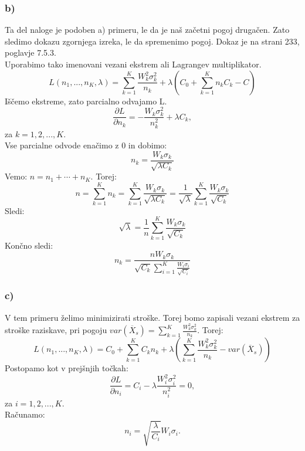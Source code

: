 \documentclass{article}
\begin{document}
\subsubsection*{b)}
Ta del naloge je podoben a) primeru, le da je naš začetni pogoj drugačen. Zato sledimo dokazu zgornjega izreka, le da spremenimo pogoj. Dokaz je na strani 233, poglavje 7.5.3.\\
Uporabimo tako imenovani vezani ekstrem ali Lagrangev multiplikator.
\begin{equation*}
L(n_1,...,n_K, \lambda) = \sum_{k=1}^K \frac{W_k^2\sigma_k^2}{n_k} + \lambda \left(  C_0 + \sum_{k=1}^K n_k C_k - C\right)
\end{equation*}
Iščemo ekstreme, zato parcialno odvajamo L.
\begin{equation*}
\frac{\partial L}{\partial n_k} = -\frac{W_k\sigma^2_k}{n_k^2} + \lambda C_k,
\end{equation*}
za $k = 1,2,...,K$.\\
Vse parcialne odvode enačimo z 0 in dobimo:
\begin{equation*}
n_k = \frac{W_k\sigma_k}{\sqrt{\lambda C_k}}
\end{equation*}
Vemo: $n = n_1+\cdots + n_K$. Torej:
\begin{equation*}
n = \sum_{k=1}^K n_k = \sum_{k=1}^K \frac{W_k\sigma_k}{\sqrt{\lambda C_k}} = \frac{1}{\sqrt{\lambda}}\sum_{k=1}^K \frac{W_k\sigma_k}{\sqrt{C_k}}
\end{equation*}
Sledi:
\begin{equation*}
\sqrt{\lambda }=   \frac{1}{n} \sum_{k=1}^K \frac{W_k\sigma_k}{\sqrt{C_k}} 
\end{equation*}
Končno sledi:
\begin{equation*}
n_k = \frac{nW_k\sigma_k}{\sqrt{C_k}\sum_{i=1}^K \frac{W_i\sigma_i}{\sqrt{C_i}}}
\end{equation*}

\subsubsection*{c)}
V tem primeru želimo minimizirati stroške. Torej bomo zapisali vezani ekstrem za stroške raziskave, pri pogoju $var(\overline{X}_s) = \sum_{k=1}^K \frac{W_k^2\sigma_k^2}{n_k}$. Torej:
\begin{equation*}
L(n_1,...,n_K,\lambda) = C_0 + \sum_{k=1}^KC_kn_k + \lambda \left(  \sum_{k=1}^K \frac{W_k^2\sigma_k^2}{n_k} - var(\overline{X}_s) \right)
\end{equation*}
Postopamo kot v prejšnjih točkah:
\begin{equation*}
\frac{\partial L}{\partial n_i} = C_i - \lambda \frac{W_i^2\sigma_i^2}{n_i^2} = 0,
\end{equation*}
za $i = 1,2,...,K$.\\
Računamo:
\begin{equation*}
n_i = \sqrt{\frac{\lambda}{C_i}} W_i \sigma_i.
\end{equation*}
\end{document}
